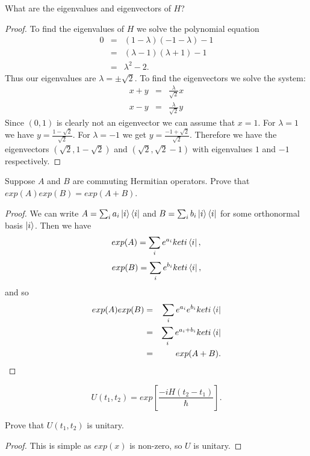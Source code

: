\documentclass{article}
\begin{document}
\begin{exercise}
  What are the eigenvalues and eigenvectors of $H$?
  \begin{proof}
    To find the eigenvalues of $H$ we solve the  polynomial equation
    \begin{eqnarray*}
      0&=&(1-\lambda)(-1-\lambda)-1 \\
      &=&(\lambda-1)(\lambda + 1)-1 \\
      &=&\lambda^2-2.
    \end{eqnarray*}
    Thus our eigenvalues are $\lambda=\pm\sqrt2$. To find the eigenvectors we solve the system:
    \begin{eqnarray*}
      x+y&=&\frac{\lambda}{\sqrt2} x \\
      x-y&=&\frac{\lambda}{\sqrt2} y
    \end{eqnarray*}
    Since $(0,1)$ is clearly not an eigenvector we can assume that $x=1$. For $\lambda=1$ we have
    $y=\frac{1-\sqrt2}{\sqrt2}$. For $\lambda=-1$ we get $y=\frac{-1+\sqrt2}{\sqrt2}$. Therefore we have the eigenvectors $(\sqrt2,1-\sqrt2)$ and $(\sqrt2,\sqrt2-1)$ with eigenvalues $1$ and $-1$ respectively.
  \end{proof}
\end{exercise}

\begin{exercise}
  Suppose $A$ and $B$ are commuting Hermitian operators. Prove that $exp(A)exp(B)=exp(A+B)$.
  \begin{proof}
    We can write $A=\sum_ia_i\ket{i}\bra{i}$ and $B=\sum_ib_i\ket{i}\bra{i}$ for some orthonormal basis $\ket{i}$. Then we have
    \[exp(A)=\sum_ie^{a_i}ket{i}\bra{i},\]
    \[exp(B)=\sum_ie^{b_i}ket{i}\bra{i},\]
    and so
    \begin{eqnarray*}
      exp(A)exp(B)&=&\sum_ie^{a_i}e^{b_i}ket{i}\bra{i} \\
       &=&\sum_ie^{a_i+b_i}ket{i}\bra{i} \\
       &=&exp(A+B).
    \end{eqnarray*}
  \end{proof}
\end{exercise}

\begin{definition}
  \[
    U(t_1,t_2)=exp\left[\frac{-iH(t_2-t_1)}{\hbar}\right].
    \]
\end{definition}

\begin{exercise}
  Prove that $U(t_1,t_2)$ is unitary.
  \begin{proof}
    This is simple as $exp(x)$ is non-zero, so $U$ is unitary.
  \end{proof}
\end{exercise}
\end{document}
